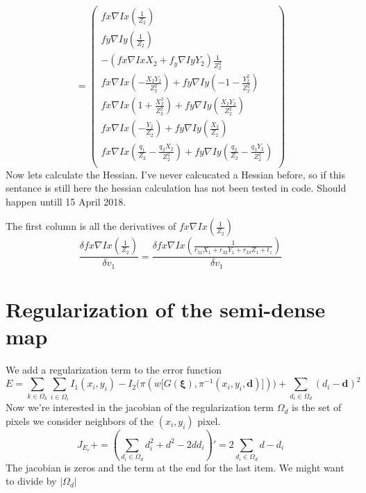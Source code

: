 \documentclass[a4paper,12pt]{article}
\begin{document}
\[
= \begin{pmatrix}
fx \nabla Ix( \frac{1}{Z_2}) \\ 
fy \nabla Iy( \frac{1}{Z_2}) \\ 
-(fx \nabla Ix X_2 + f_y\nabla Iy Y_2 )\frac{ 1}{Z_2^2} \\ 
fx \nabla Ix (-\frac{X_2 Y_2}{Z_2^2} ) + fy \nabla Iy ( -1-\frac{Y_2^2}{Z_2^2} ) \\
fx \nabla Ix ( 1+\frac{X_2^2}{Z_2^2} ) + fy \nabla Iy (  \frac{X_2 Y_2}{Z_2^2} ) \\
fx \nabla Ix ( -\frac{Y_2}{Z_2} ) + fy \nabla Iy (  \frac{X_2}{Z_2}) \\
fx \nabla Ix (  \frac{q_1}{Z_2} - \frac{q_3 X_2}{Z_2^2} ) + fy \nabla Iy (  \frac{q_2}{Z_2} - \frac{q_3 Y_2}{Z_2^2}) \\
\end{pmatrix} 
\]
Now lets calculate the Hessian. I've never calcucated a Hessian before, so if this sentance is still here the hessian calculation has not been tested in code. Should happen untill 15 April 2018.
\par
The first column is all the derivatives of $fx \nabla Ix( \frac{1}{Z_2})$
\[
\frac{\delta fx \nabla Ix( \frac{1}{Z_2})} {\delta v_1} = 
\frac{\delta fx \nabla Ix( \frac{1}{r_{31}X_1+r_{32}Y_1+r_{33}Z_1 + t_z})} {\delta v_1}
\]
\section{Regularization of the semi-dense map}
We add a regularization term to the error function
\[
E = \sum_{k \in \Omega_{k}} \sum_{i \in \Omega_{i}} I_1(x_i,y_i)-I_2\bigg(\pi(w\big[{G(\boldsymbol{\xi})},\pi^{-1}(x_i,y_i,\mathbf{d})\big])\bigg) + \sum_{d_i \in \Omega_d} (d_i-\mathbf{d})^2
\]
Now we're interested in the jacobian of the regularization term $\Omega_d$ is the set of pixels we consider neighbors of the $(x_i,y_i)$ pixel.
\[
J_{E_r} += (\sum_{d_i \in \Omega_d} d_i^2 + d^2-2dd_i)' = 2\sum_{d_i \in \Omega_d}  d-d_i
\]
The jacobian is zeros and the term at the end for the last item. We might want to divide by $|\Omega_d|$
\end{document}
